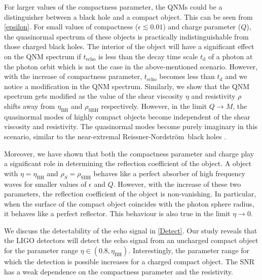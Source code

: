 \documentclass[aps,prd,twocolumn,floatfix,noshowpacs,tightenlines,noshowkeys,superscriptaddress,amsmath,amssymb,
nofootinbib]{revtex4-1}
\renewcommand\[{\begin{equation}}
\renewcommand\]{\end{equation}}
\def\RN{Reissner-Nordstr\"{o}m}
\begin{document}
For larger values of the compactness parameter, the QNMs could be a distinguisher between a black hole and a compact object. This can be seen from \autoref{epsilon}. For small values of compactness ($\epsilon\lesssim 0.01$) and charge parameter ($Q$), the quasinormal spectrum of these objects is practically indistinguishable from those charged black holes. The interior of the object will have a significant effect on the QNM spectrum if $t_{\textrm{echo}}$  is less than the decay time scale $t_{\textrm{d}}$ of a photon at the photon orbit \cite{Maggio:2020jml} which is not the case in the above-mentioned scenario. However, with the increase of compactness parameter, $t_{\textrm{echo}}$ becomes less than $t_{\textrm{d}}$ and we notice a modification in the QNM spectrum.  Similarly, we show that the QNM spectrum gets modified as the value of the shear viscosity $\eta$ and resistivity $\rho$ shifts away from $\eta_{\textrm{BH}}$ and $\rho_{\textrm{SBH}}$ respectively.  However, in the limit $Q\to M$, the quasinormal modes of highly compact objects become independent of the shear viscosity and resistivity. The quasinormal modes become purely imaginary in this scenario, similar to the near-extremal \RN\ black holes \cite{Kim:2012mh,Chen:2012zn,Rahman:2018oso}.\par
 Moreover, we have shown that both the compactness parameter and charge play a significant role in determining the reflection coefficient of the object. A object with $\eta=\eta_{\textrm{BH}}$ and $\rho_{S}=\rho_{\textrm{SBH}}$ behaves like a perfect absorber of high frequency waves for smaller values of $\epsilon$ and $Q$. However, with the increase of these two parameters, the reflection coefficient of the object is non-vanishing. In particular, when the surface of the compact object coincides with the photon sphere radius, it behaves like a perfect reflector. This behaviour is also true in the limit $\eta\to 0$.  \par
We discuss the detectability of the echo signal in \autoref{Detect}. Our study reveals that the  LIGO detectors will detect the echo signal from an uncharged compact object for the parameter range $\eta\in(0.8, \eta_{\textrm{BH}})$. Interestingly, the parameter range for which the detection is possible increases for a charged compact object. The SNR has a  weak dependence on the compactness parameter and the resistivity. \par
\end{document}
